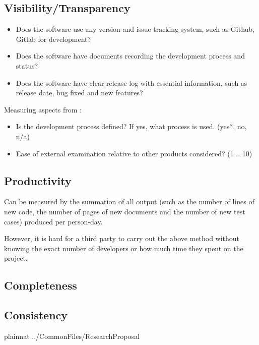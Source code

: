 \documentclass{article}
\begin{document}
\subsection{Visibility/Transparency}
\begin{itemize}
\item Does the software use any version and issue tracking system, such as
Github, Gitlab for development?
\item Does the software have documents recording the development process and
status?
\item Does the software have clear release log with essential information, such
as release date, bug fixed and new features?
\end{itemize}

\noindent Measuring aspects from \citep{SmithEtAl2018}:
\begin{itemize}
\item Is the development process defined? If yes, what process is used. ({yes*,
no, n/a})
\item Ease of external examination relative to other products considered? ({1 ..
10})
\end{itemize}

\subsection{Productivity}
Can be measured by the summation of all output (such as the number of lines of
new code, the number of pages of new documents and the number of new test cases)
produced per person-day.

However, it is hard for a third party to carry out the above method without
knowing the exact number of developers or how much time they spent on the
project.

\subsection{Completeness}

\subsection{Consistency}

\newpage

 {plainnat}
 {../CommonFiles/ResearchProposal}
\end{document}

